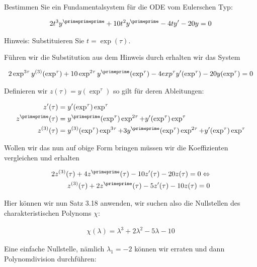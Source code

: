 \begin{exercise}
  Bestimmen Sie ein Fundamentalsystem für die ODE vom Eulerschen Typ:

  \begin{align*}
    2t^3 y^\primeprimeprime + 10t^2 y^\primeprime - 4ty^\prime - 20y = 0
  \end{align*}

  Hinweis: Substituieren Sie $t = \exp(\tau)$.
\end{exercise}

\begin{solution}
  Führen wir die Substitution aus dem Hinweis durch erhalten wir das System

  \begin{align*}
    2\exp^{3\tau} y^{(3)}(\exp^\tau) + 10\exp^{2\tau} y^\primeprime (\exp^\tau)
    -4 exp^\tau y^\prime (\exp^\tau) - 20 y(\exp^\tau) = 0
  \end{align*}

  Definieren wir $z(\tau)=y(\exp^\tau)$ so gilt für deren Ableitungen:

  \begin{align*}
    z^\prime (\tau) &= y^\prime (\exp^\tau)\exp^\tau \\
    z^\primeprime (\tau) &= y^\primeprime (\exp^\tau) \exp^{2\tau} +
    y^\prime (\exp^\tau)\exp^\tau \\
    z^{(3)}(\tau) &= y^{(3)}(\exp^\tau) \exp^{3\tau} + 3y^\primeprime (\exp^\tau)
    \exp^{2\tau} + y^\prime (\exp^\tau) \exp^\tau
  \end{align*}

  Wollen wir das nun auf obige Form bringen müssen wir die Koeffizienten vergleichen und erhalten

  \begin{align*}
    2z^{(3)}(\tau)+4z^\primeprime (\tau) -10 z^\prime (\tau) - 20z(\tau) = 0
    \Leftrightarrow \\
    z^{(3)}(\tau)+2z^\primeprime (\tau) -5 z^\prime (\tau) - 10z(\tau) = 0
  \end{align*}

  Hier können wir nun Satz 3.18 anwenden, wir suchen also die Nullstellen des
  charakteristischen Polynoms $\chi$:

  \begin{align*}
    \chi(\lambda) = \lambda^3 + 2\lambda^2 -5\lambda - 10
  \end{align*}

  Eine einfache Nullstelle, nämlich $\lambda _1 =-2$ können wir erraten und dann Polynomdivision
  durchführen:


\end{solution}
